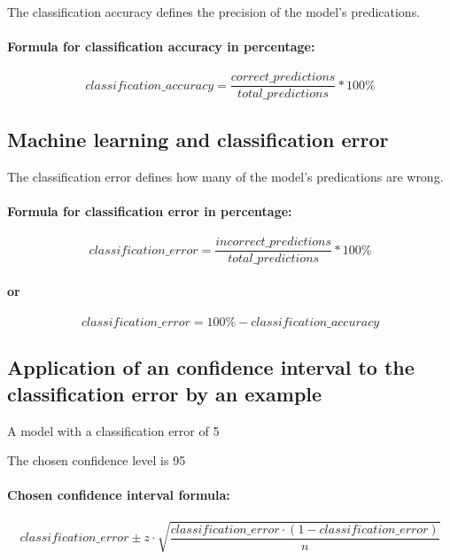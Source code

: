 \documentclass[a4paper,13pt,twoside]{book}
\begin{document}
The classification accuracy defines the precision of the model's predications.

\paragraph{Formula for classification accuracy in percentage:}

$$
classification\_accuracy =
\frac{correct\_predictions}{total\_predictions}
* 100 \%
$$



\subsection{Machine learning and classification error}

The classification error defines how many of the model's predications are wrong.

\paragraph{Formula for classification error in percentage:}

$$
classification\_error =
\frac{incorrect\_predictions}{total\_predictions}
* 100 \%
$$

\paragraph{or}

$$
classification\_error =
100 \% - classification\_accuracy
$$



\subsection{Application of an confidence interval to the classification error by an example}

A model with a classification error of 5%

The chosen confidence level is 95%

\paragraph{Chosen confidence interval formula:}

$$
classification\_error \pm
z \cdot 
\sqrt{
\frac
{classification\_error \cdot (1 - classification\_error)}
{n}
}
$$
\end{document}
